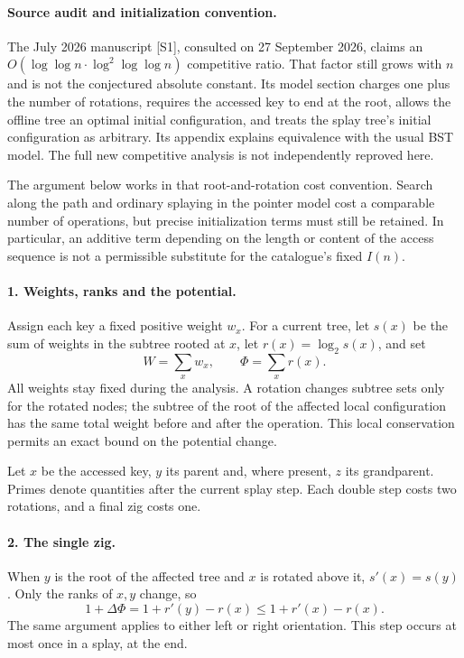 \documentclass[11pt]{article}
\begin{document}
\paragraph{Source audit and initialization convention.}
The July 2026 manuscript [S1], consulted on 27 September 2026, claims an $O(\log\log n\cdot\log^2\log\log n)$ competitive ratio. That factor still grows with $n$ and is not the conjectured absolute constant. Its model section charges one plus the number of rotations, requires the accessed key to end at the root, allows the offline tree an optimal initial configuration, and treats the splay tree's initial configuration as arbitrary. Its appendix explains equivalence with the usual BST model. The full new competitive analysis is not independently reproved here.

The argument below works in that root-and-rotation cost convention. Search along the path and ordinary splaying in the pointer model cost a comparable number of operations, but precise initialization terms must still be retained. In particular, an additive term depending on the length or content of the access sequence is not a permissible substitute for the catalogue's fixed $I(n)$.

\paragraph{1. Weights, ranks and the potential.}
Assign each key a fixed positive weight $w_x$. For a current tree, let $s(x)$ be the sum of weights in the subtree rooted at $x$, let $r(x)=\log_2s(x)$, and set
\[
 W=\sum_xw_x,\qquad \Phi=\sum_x r(x).
\]
All weights stay fixed during the analysis. A rotation changes subtree sets only for the rotated nodes; the subtree of the root of the affected local configuration has the same total weight before and after the operation. This local conservation permits an exact bound on the potential change.

Let $x$ be the accessed key, $y$ its parent and, where present, $z$ its grandparent. Primes denote quantities after the current splay step. Each double step costs two rotations, and a final zig costs one.

\paragraph{2. The single zig.}
When $y$ is the root of the affected tree and $x$ is rotated above it, $s'(x)=s(y)$. Only the ranks of $x,y$ change, so
\[
 1+\Delta\Phi=1+r'(y)-r(x)
 \le1+r'(x)-r(x).
\]
The same argument applies to either left or right orientation. This step occurs at most once in a splay, at the end.
\end{document}

